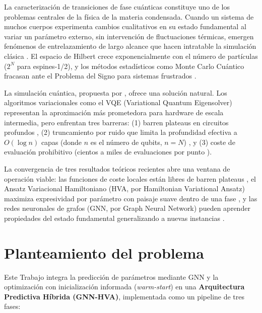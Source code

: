 \documentclass[11pt,a4paper,spanish]{book}
\begin{document}
La caracterización de transiciones de fase cuánticas constituye uno de los problemas centrales de la física de la materia condensada. Cuando un sistema de muchos cuerpos experimenta cambios cualitativos en su estado fundamental al variar un parámetro externo, sin intervención de fluctuaciones térmicas, emergen fenómenos de entrelazamiento de largo alcance que hacen intratable la simulación clásica \citep{dutta2015, anderson1972}. El espacio de Hilbert crece exponencialmente con el número de partículas ($2^N$ para espines-1/2), y los métodos estadísticos como Monte Carlo Cuántico fracasan ante el Problema del Signo para sistemas frustrados \citep{troyer2005}.

La simulación cuántica, propuesta por \citet{feynman1982}, ofrece una solución natural. Los algoritmos variacionales como el VQE (Variational Quantum Eigensolver) \citep{peruzzo2014} representan la aproximación más prometedora para hardware de escala intermedia, pero enfrentan tres barreras: (1) barren plateaus en circuitos profundos \citep{mcclean2018, cerezo2021}, (2) truncamiento por ruido que limita la profundidad efectiva a $O(\log n)$ capas (donde $n$ es el número de qubits, $n = N$) \citep{mele2026}, y (3) coste de evaluación prohibitivo (cientos a miles de evaluaciones por punto \citep{tilly2022}).

La convergencia de tres resultados teóricos recientes abre una ventana de operación viable: las funciones de coste locales están libres de barren plateaus \citep{cerezo2021}, el Ansatz Variacional Hamiltoniano (HVA, por Hamiltonian Variational Ansatz) maximiza expresividad por parámetro con paisaje suave dentro de una fase \citep{wiersema2020, mele2022, puig2025}, y las redes neuronales de grafos (GNN, por Graph Neural Network) pueden aprender propiedades del estado fundamental generalizando a nuevas instancias \citep{huang2022, miao2024, zhang2025}.

\section{Planteamiento del problema}

Este Trabajo integra la predicción de parámetros mediante GNN \citep{miao2024, zhang2025} y la optimización con inicialización informada (\emph{warm-start}) \citep{puig2025} en una \textbf{Arquitectura Predictiva Híbrida (GNN-HVA)}, implementada como un pipeline de tres fases:
\end{document}
